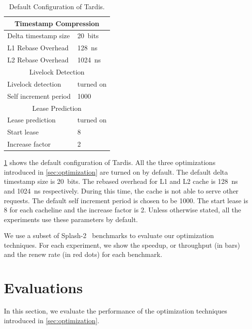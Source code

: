 \documentclass[12pt]{article}
\begin{document}
\begin{table}
	\caption{ Default Configuration of Tardis. }
	\begin{center}
	{ 
		\begin{tabular}{|l|l|}
            \hline
			\multicolumn{2}{|c|}{Timestamp Compression} \\
			\hline
			Delta timestamp size 		& 20~bits \\
			L1 Rebase Overhead 			& 128~ns\\
			L2 Rebase Overhead			& 1024~ns \\
			\hline
			\multicolumn{2}{|c|}{Livelock Detection} \\
			\hline
			Livelock detection 			& turned on \\
			Self increment period 		& 1000 \\
			\hline
			\multicolumn{2}{|c|}{Lease Prediction} \\
			\hline
			Lease prediction			& turned on \\
			Start lease 				& 8 \\
			Increase factor				& 2 \\
			\hline
		\end{tabular}
    }
	\end{center}
    \label{tab:system}
	\vspace{-.2in}
\end{table}

\cref{tab:system} shows the default configuration of Tardis. All the 
three optimizations introduced in \cref{sec:optimization} are turned 
on by default. The default delta timestamp size is 20~bits. The
rebased overhead for L1 and L2 cache is 128~ns and 1024~ns 
respectively. During this  time, the cache is not able to serve 
other requests. The default self increment period is chosen to be 
1000. The start lease is 8 for each cacheline and the increase factor 
is 2. Unless otherwise stated, all the experiments use these 
parameters by default.

We use a subset of Splash-2~\cite{splash2} benchmarks to evaluate our 
optimization techniques. For each experiment, we show the speedup, or throughput (in 
bars) and the renew rate (in red dots) for each benchmark.

\section{Evaluations}

In this section, we evaluate the performance of the optimization 
techniques introduced in \cref{sec:optimization}.
\end{document}
